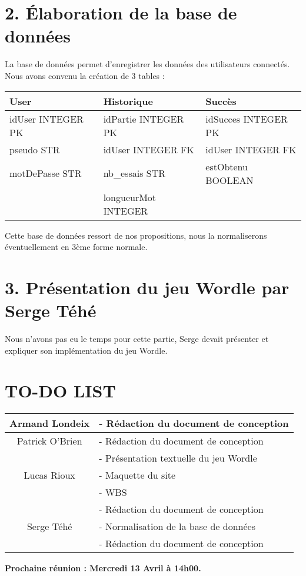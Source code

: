 \section*{2. Élaboration de la base de données}
\tabto{1cm}La base de données permet d’enregistrer les données des utilisateurs connectés. Nous avons convenu la création de 3 tables :

\begin{center}
\begin{tabular}[c]{|l|l|l|}
    \hline
    \textbf{User} & \textbf{Historique} & \textbf{Succès} \\
    \hline
    idUser INTEGER PK & idPartie INTEGER PK & idSucces INTEGER PK \\
    pseudo STR & idUser INTEGER FK & idUser INTEGER FK \\
    motDePasse STR & nb\_essais STR & estObtenu BOOLEAN \\
    & longueurMot INTEGER & \\
    \hline
\end{tabular}
\end{center}

Cette base de données ressort de nos propositions, nous la normaliserons éventuellement en 3ème forme normale.


\section*{3. Présentation du jeu Wordle par Serge Téhé}
\tabto{1cm}Nous n’avons pas eu le temps pour cette partie, Serge devait présenter et expliquer son implémentation du jeu Wordle.

\section*{TO-DO LIST}

\begin{center}
\begin{tabular}{|c|l|}
    \hline
    Armand Londeix & - Rédaction du document de conception \\
    \hline
    Patrick O'Brien & - Rédaction du document de conception \\
    & - Présentation textuelle du jeu Wordle \\
    \hline
    Lucas Rioux & - Maquette du site \\
    & - WBS \\
    & - Rédaction du document de conception \\
    \hline
    Serge Téhé & - Normalisation de la base de données \\
    & - Rédaction du document de conception \\
    \hline
\end{tabular}
\end{center}

\tabto{0cm}\textbf{Prochaine réunion : Mercredi 13 Avril à 14h00.}